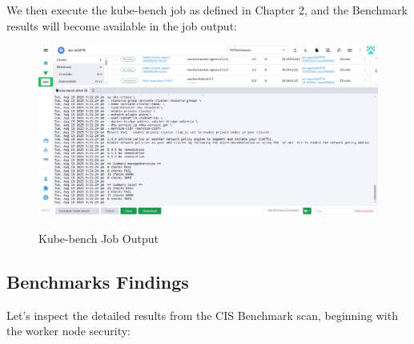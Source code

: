 We then execute the kube-bench job as defined in Chapter 2, and the Benchmark results will become available in the job output:

\begin{figure}[H]
\centering
\caption {Kube-bench Job Output}
\includegraphics[width=\linewidth]{images/kube-bench-sbhdt.png}
\label{fig:kubesbhdt}
\end{figure}

\pagebreak

\subsection{Benchmarks Findings}

Let's inspect the detailed results from the CIS Benchmark scan, beginning with the worker node security:

